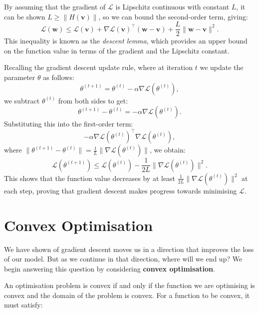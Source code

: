 By assuming that the gradient of $\mathcal{L}$ is Lipschitz continuous with constant $L$, it can be shown $L \geq \|H(\bm{v})\|$, so we can bound the second-order term, giving:
\[
    \mathcal{L}(\bm{w}) \leq \mathcal{L}(\bm{v}) + \nabla \mathcal{L}(\bm{v})^\top (\bm{w} - \bm{v}) + \frac{L}{2} \|\bm{w} - \bm{v}\|^2.
\]
This inequality is known as the \textit{descent lemma}, which provides an upper bound on the function value in terms of the gradient and the Lipschitz constant.

Recalling the gradient descent update rule, where at iteration \(t\) we update the parameter \(\theta\) as follows:
\[
    \theta^{(t+1)} = \theta^{(t)} - \alpha \nabla \mathcal{L}(\theta^{(t)}),
\]
we subtract \(\theta^{(t)}\) from both sides to get:
\[
    \theta^{(t+1)} - \theta^{(t)} = -\alpha \nabla \mathcal{L}(\theta^{(t)}).
\]
Substituting this into the first-order term:
\[
    -\alpha \nabla \mathcal{L}(\theta^{(t)})^\top \nabla \mathcal{L}(\theta^{(t)}),
\]
where \(\|\theta^{(t+1)} - \theta^{(t)}\| = \frac{1}{L} \|\nabla \mathcal{L}(\theta^{(t)})\|\), we obtain:
\[
    \mathcal{L}(\theta^{(t+1)}) \leq \mathcal{L}(\theta^{(t)}) - \frac{1}{2L} \|\nabla \mathcal{L}(\theta^{(t)})\|^2.
\]
This shows that the function value decreases by at least \(\frac{1}{2L} \|\nabla \mathcal{L}(\theta^{(t)})\|^2\) at each step, proving that gradient descent makes progress towards minimising \(\mathcal{L}\).

\section{Convex Optimisation}

We have shown of gradient descent moves us in a direction that improves the loss of our model. But as we continue in that direction, where will we end up? We begin answering this question by considering \textbf{convex optimisation}. \bigskip

An optimisation problem is convex if and only if the function we are optimising is convex and the domain of the problem is convex. For a function to be convex, it must satisfy:


